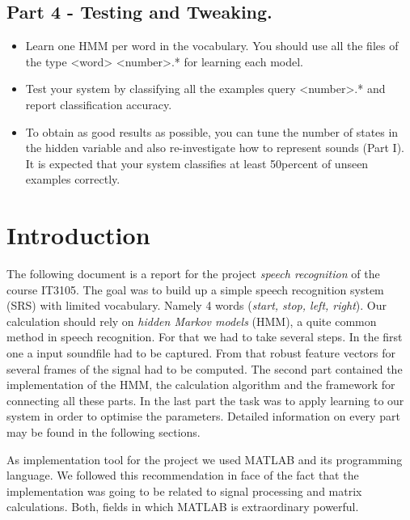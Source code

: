 \documentclass[titlepage]{article}
\begin{document}
    \subsection{Part 4 - Testing and Tweaking. }
\begin{itemize}
\item Learn one HMM per word in the vocabulary. You should use all the ﬁles of the type <word> <number>.* for learning each model.
\item Test your system by classifying all the examples query <number>.* and report classiﬁcation accuracy.
\item To obtain as good results as possible, you can tune the number of states in the hidden variable and also re-investigate how to represent sounds (Part I). It is expected that your system classiﬁes at least 50percent of unseen examples correctly.
\end{itemize}




\section{Introduction}
The following document is a report for the project \emph{speech recognition} of the course IT3105. The goal was to build up a simple speech recognition system (SRS) with limited vocabulary. Namely 4 words (\emph{start, stop, left, right}). Our calculation should rely on \emph{hidden Markov models} (HMM), a quite common method in speech recognition. For that we had to take several steps. In the first one a input soundfile had to be captured. From that robust feature vectors for several frames of the signal had to be computed. The second part contained the implementation of the HMM, the calculation algorithm and the framework for connecting all these parts. In the last part the task was to apply learning to our system in order to optimise the parameters. Detailed information on every part may be found in the following sections.

As implementation tool for the project we used MATLAB and its programming language. We followed this recommendation in face of the fact that the implementation was going to be related to signal processing and matrix calculations. Both, fields in which MATLAB is extraordinary powerful.
\end{document}
